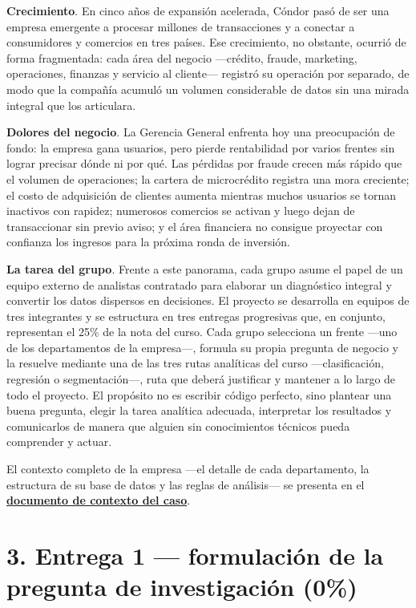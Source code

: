 \documentclass[11pt,letterpaper]{article}
\begin{document}
\textbf{Crecimiento}. En cinco años de expansión acelerada, Cóndor pasó de ser una empresa emergente a procesar millones de transacciones y a conectar a consumidores y comercios en tres países. Ese crecimiento, no obstante, ocurrió de forma fragmentada: cada área del negocio —crédito, fraude, marketing, operaciones, finanzas y servicio al cliente— registró su operación por separado, de modo que la compañía acumuló un volumen considerable de datos sin una mirada integral que los articulara.

\textbf{Dolores del negocio}. La Gerencia General enfrenta hoy una preocupación de fondo: la empresa gana usuarios, pero pierde rentabilidad por varios frentes sin lograr precisar dónde ni por qué. Las pérdidas por fraude crecen más rápido que el volumen de operaciones; la cartera de microcrédito registra una mora creciente; el costo de adquisición de clientes aumenta mientras muchos usuarios se tornan inactivos con rapidez; numerosos comercios se activan y luego dejan de transaccionar sin previo aviso; y el área financiera no consigue proyectar con confianza los ingresos para la próxima ronda de inversión.

\textbf{La tarea del grupo}. Frente a este panorama, cada grupo asume el papel de un equipo externo de analistas contratado para elaborar un diagnóstico integral y convertir los datos dispersos en decisiones. El proyecto se desarrolla en equipos de tres integrantes y se estructura en tres entregas progresivas que, en conjunto, representan el 25\% de la nota del curso. Cada grupo selecciona un frente —uno de los departamentos de la empresa—, formula su propia pregunta de negocio y la resuelve mediante una de las tres rutas analíticas del curso —clasificación, regresión o segmentación—, ruta que deberá justificar y mantener a lo largo de todo el proyecto. El propósito no es escribir código perfecto, sino plantear una buena pregunta, elegir la tarea analítica adecuada, interpretar los resultados y comunicarlos de manera que alguien sin conocimientos técnicos pueda comprender y actuar.

El contexto completo de la empresa —el detalle de cada departamento, la estructura de su base de datos y las reglas de análisis— se presenta en el \href{https://eduard-martinez.github.io/teaching/ba/final_project/contexto_caso_condor.pdf} {\textbf{documento de contexto del caso}}.

\clearpage
\section{3. Entrega 1 --- formulación de la pregunta de investigación (0\%)}
\end{document}
